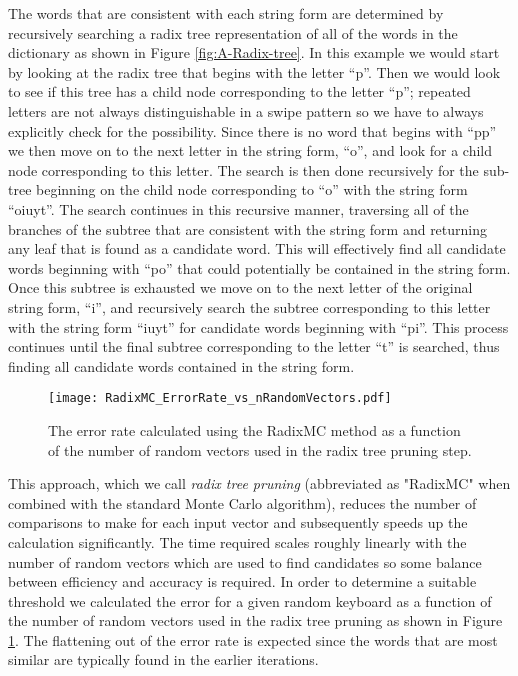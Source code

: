 \documentclass[final,1p,times,authoryear]{elsarticle}
\begin{document}
The words that are consistent with each string form are determined
by recursively searching a radix tree representation of all of the
words in the dictionary as shown in Figure \ref{fig:A-Radix-tree}.
In this example we would start by looking at the radix tree that begins
with the letter ``p''. Then we would look to see if this tree has
a child node corresponding to the letter ``p''; repeated letters
are not always distinguishable in a swipe pattern so we have to always
explicitly check for the possibility. Since there is no word that
begins with ``pp'' we then move on to the next letter in the string
form, ``o'', and look for a child node corresponding to this letter.
The search is then done recursively for the sub-tree beginning on
the child node corresponding to ``o'' with the string form ``oiuyt''.
The search continues in this recursive manner, traversing all of the
branches of the subtree that are consistent with the string form and
returning any leaf that is found as a candidate word. This will effectively
find all candidate words beginning with ``po'' that could potentially
be contained in the string form. Once this subtree is exhausted we
move on to the next letter of the original string form, ``i'', and
recursively search the subtree corresponding to this letter with the
string form ``iuyt'' for candidate words beginning with ``pi''.
This process continues until the final subtree corresponding to the
letter ``t'' is searched, thus finding all candidate words contained
in the string form.

\begin{figure}[t]
\begin{centering}
\texttt{[image: RadixMC\_ErrorRate\_vs\_nRandomVectors.pdf]}
\par\end{centering}
\smallskip{}
\protect\caption{The error rate calculated using the RadixMC method as a function of 
the number of random vectors used in the radix tree pruning step.\label{fig:radix_vs_nvectors}}
\end{figure}

This approach, which we call \textit{radix tree pruning} (abbreviated as "RadixMC" when combined with the standard Monte Carlo algorithm), reduces the number of comparisons to make for each input vector and subsequently speeds up the calculation significantly.
The time required scales roughly linearly with the number of random vectors which are used to find candidates so some balance between efficiency and accuracy is required.
In order to determine a suitable threshold we calculated the error for a given random keyboard as a function of the number of random vectors used in the radix tree pruning as shown in Figure \ref{fig:radix_vs_nvectors}.
The flattening out of the error rate is expected since the words that are most similar are typically found in the earlier iterations.
\end{document}
